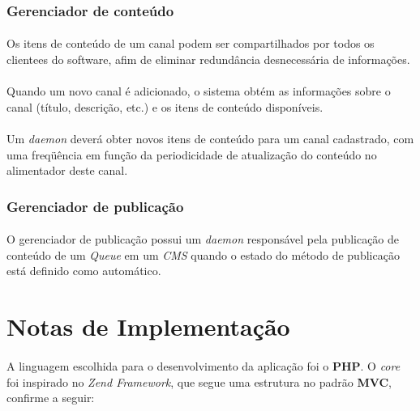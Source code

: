 \documentclass[a4paper,12pt]{article}
\def\blog{\emph{CMS}}
\def\queue{\emph{Queue}}
\begin{document}
\subsubsection{Gerenciador de conteúdo} \label{gerenciadorconteudo}

\paragraph{}
Os itens de conteúdo de um canal podem ser compartilhados por todos os
clientees do software, afim de eliminar redundância desnecessária de
informações.

\paragraph{}
Quando um novo canal é adicionado, o sistema obtém as informações sobre o canal
(título, descrição, etc.) e os itens de conteúdo disponíveis.

\paragraph{}
Um \emph{daemon} deverá obter novos itens de conteúdo para um canal cadastrado,
com uma freqüência em função da periodicidade de atualização do conteúdo no
alimentador deste canal.

\subsubsection{Gerenciador de publicação} \label{gerenciadorpublicacao}

\paragraph{}
O gerenciador de publicação possui um \emph{daemon} responsável pela publicação
de conteúdo de um \queue{} em um \blog{} quando o estado do método de publicação
está definido como automático. 

\section{Notas de Implementação}

\paragraph{}
A linguagem escolhida para o desenvolvimento da aplicação foi o \textbf{PHP}. O \emph{core} foi inspirado no \emph{Zend Framework}, que segue uma estrutura no padrão \textbf{MVC}, confirme a seguir:
\end{document}
